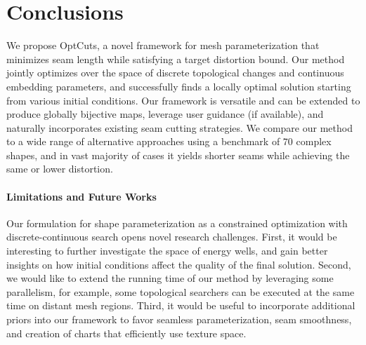 
\section{Conclusions}
\label{sec:conclusion}

We propose OptCuts, a novel framework for mesh parameterization that minimizes seam length while satisfying a target distortion bound. Our method jointly optimizes over the space of discrete topological changes and continuous embedding parameters, and successfully finds a locally optimal solution starting from various initial conditions. Our framework is versatile and can be extended to produce globally bijective maps, leverage user guidance (if available), and naturally incorporates existing seam cutting strategies. We compare our method to a wide range of alternative approaches using a benchmark of 70 complex shapes, and in vast majority of cases it yields shorter seams while achieving the same or lower distortion. 

\paragraph{Limitations and Future Works}
Our formulation for shape parameterization as a constrained optimization with discrete-continuous search opens novel research challenges. First, it would be interesting to further investigate the space of energy wells, and gain better insights on how initial conditions affect the quality of the final solution. Second, we would like to extend the running time of our method by leveraging some parallelism, for example, some topological searchers can be executed at the same time on distant mesh regions. Third, it would be useful to incorporate additional priors into our framework to favor seamless parameterization, seam smoothness, and creation of charts that efficiently use texture space. 


